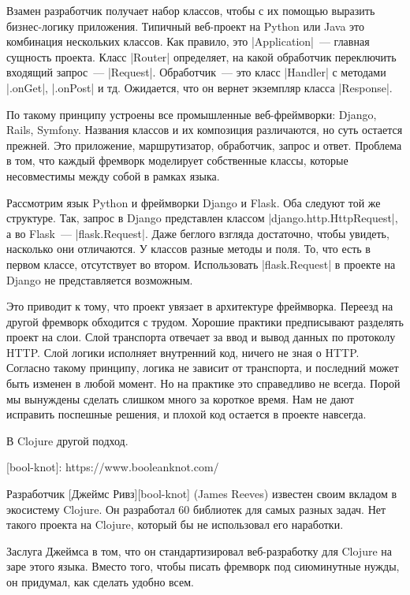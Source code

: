 Взамен разработчик получает набор классов, чтобы с их помощью выразить
бизнес-логику приложения. Типичный веб-проект на Python или Java это комбинация
нескольких классов. Как правило, это \spverb|Application|~--- главная сущность
проекта. Класс \spverb|Router| определяет, на какой обработчик переключить входящий
запрос~--- \spverb|Request|. Обработчик~--- это класс \spverb|Handler| с методами \spverb|.onGet|,
\spverb|.onPost| и тд. Ожидается, что он вернет экземпляр класса \spverb|Response|.

По такому принципу устроены все промышленные веб-фреймворки: Django, Rails,
Symfony. Названия классов и их композиция различаются, но суть остается
прежней. Это приложение, маршрутизатор, обработчик, запрос и ответ. Проблема в
том, что каждый фремворк моделирует собственные классы, которые несовместимы
между собой в рамках языка.

Рассмотрим язык Python и фреймворки Django и Flask. Оба следуют той же
структуре. Так, запрос в Django представлен классом \spverb|django.http.HttpRequest|, а
во Flask~--- \spverb|flask.Request|. Даже беглого взгляда достаточно, чтобы увидеть,
насколько они отличаются. У классов разные методы и поля. То, что есть в первом
классе, отсутствует во втором. Использовать \spverb|flask.Request| в проекте на Django
не представляется возможным.

Это приводит к тому, что проект увязает в архитектуре фреймворка. Переезд на
другой фремворк обходится с трудом. Хорошие практики предписывают разделять
проект на слои. Слой транспорта отвечает за ввод и вывод данных по протоколу
HTTP. Слой логики исполняет внутренний код, ничего не зная о HTTP. Согласно
такому принципу, логика не зависит от транспорта, и последний может быть изменен
в любой момент. Но на практике это справедливо не всегда. Порой мы вынуждены
сделать слишком много за короткое время. Нам не дают исправить поспешные
решения, и плохой код остается в проекте навсегда.

В Clojure другой подход.

[bool-knot]: https://www.booleanknot.com/

Разработчик [Джеймс Ривз][bool-knot] (James Reeves) известен своим вкладом в
экосистему Clojure. Он разработал 60 библиотек для самых разных задач. Нет
такого проекта на Clojure, который бы не использовал его наработки.

Заслуга Джеймса в том, что он стандартизировал веб-разработку для Clojure на
заре этого языка. Вместо того, чтобы писать фремворк под сиюминутные нужды, он
придумал, как сделать удобно всем.

